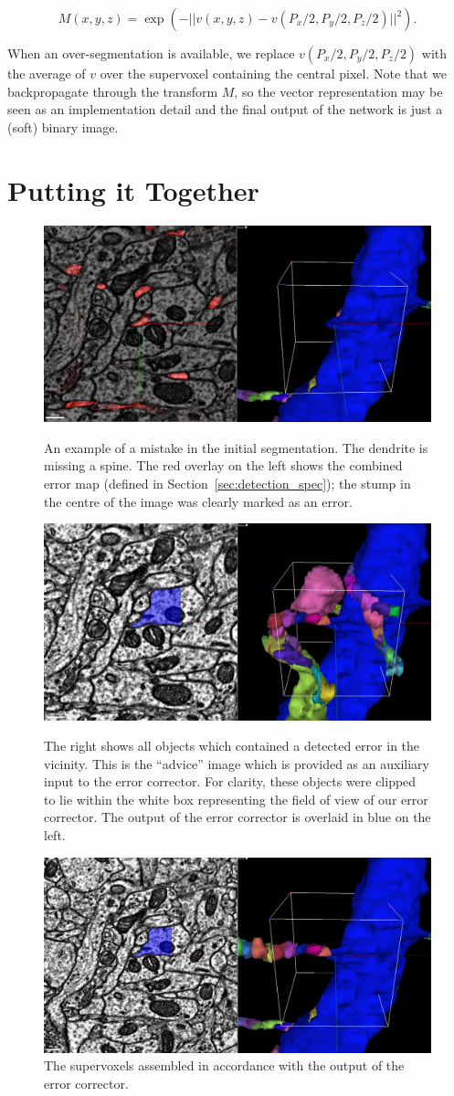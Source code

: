 \documentclass{article}
\begin{document}
\begin{equation*}
	M(x,y,z)=\exp\left( -||v(x,y,z)-v(P_x/2,P_y/2,P_z/2)||^2 \right).
\end{equation*}

When an over-segmentation is available, we replace $v(P_x/2,P_y/2,P_z/2)$ with the average of $v$ over the supervoxel containing the central pixel. Note that we backpropagate through the transform $M$, so the vector representation may be seen as an implementation detail and the final output of the network is just a (soft) binary image.


\section{Putting it Together}

\begin{figure}
\begin{center}
	\includegraphics[width=0.65\linewidth]{errors.jpg}
	\caption{An example of a mistake in the initial segmentation. The dendrite is missing a spine. The red overlay on the left shows the combined error map (defined in Section~\ref{sec:detection_spec}); the stump in the centre of the image was clearly marked as an error.}

	\includegraphics[width=0.65\linewidth]{neighbours.jpg}
	\caption{The right shows all objects which contained  a detected error in the vicinity. This is the ``advice'' image which is provided as an auxiliary input to the error corrector. For clarity, these objects were clipped to lie within the white box representing the field of view of our error corrector. The output of the error corrector is overlaid in blue on the left.}

	\includegraphics[width=0.65\linewidth]{final.jpg}
	\caption{The supervoxels assembled in accordance with the output of the error corrector.}
\end{center}
\end{figure}
\end{document}
